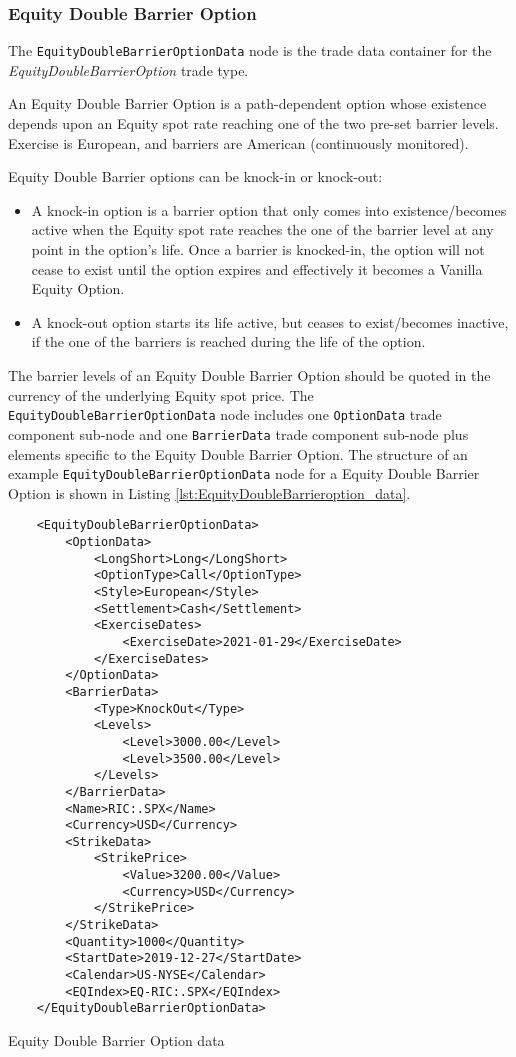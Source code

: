 \subsubsection{Equity Double Barrier Option}

The \lstinline!EquityDoubleBarrierOptionData!  node is the trade data container for the \emph{EquityDoubleBarrierOption} trade type.  

An Equity Double Barrier Option is a path-dependent option whose existence depends upon
an Equity spot rate reaching one of the two pre-set barrier levels. Exercise is European, and barriers are American (continuously monitored).

Equity Double Barrier options can be knock-in or knock-out:
\begin{itemize}
\item A knock-in option is a barrier option that only comes into existence/becomes active
when the Equity spot rate reaches the one of the barrier level at any point in the
option's life. Once a barrier is knocked-in, the option will not cease to exist until
the option expires and effectively it becomes a Vanilla Equity Option.
\item A knock-out option starts its life active, but ceases to exist/becomes inactive, if
the one of the barriers is reached during the life of the option.
\end{itemize}

The barrier levels of an Equity Double Barrier Option should be quoted in the currency of 
the underlying Equity spot price. The \lstinline!EquityDoubleBarrierOptionData!  node includes
one \lstinline!OptionData! trade component sub-node and one \lstinline!BarrierData! trade
component sub-node plus elements specific to the Equity Double Barrier Option.
The structure of an example \lstinline!EquityDoubleBarrierOptionData! node for a Equity Double
Barrier Option is shown in Listing
\ref{lst:EquityDoubleBarrieroption_data}.

\begin{listing}[H]
\begin{verbatim}
    <EquityDoubleBarrierOptionData>
        <OptionData>
            <LongShort>Long</LongShort>
            <OptionType>Call</OptionType>
            <Style>European</Style>
            <Settlement>Cash</Settlement>
            <ExerciseDates>
                <ExerciseDate>2021-01-29</ExerciseDate>
            </ExerciseDates>
        </OptionData>
        <BarrierData>
            <Type>KnockOut</Type>
            <Levels>
                <Level>3000.00</Level>
                <Level>3500.00</Level>
            </Levels>
        </BarrierData>
        <Name>RIC:.SPX</Name>
        <Currency>USD</Currency>
		<StrikeData>
			<StrikePrice>
				<Value>3200.00</Value>
				<Currency>USD</Currency>
			</StrikePrice>
		</StrikeData>
        <Quantity>1000</Quantity>
        <StartDate>2019-12-27</StartDate>
        <Calendar>US-NYSE</Calendar>
        <EQIndex>EQ-RIC:.SPX</EQIndex>
    </EquityDoubleBarrierOptionData>
\end{verbatim}
\caption{Equity Double Barrier Option data}
\label{lst:EquityDoubleBarrieroption_data}
\end{listing}

